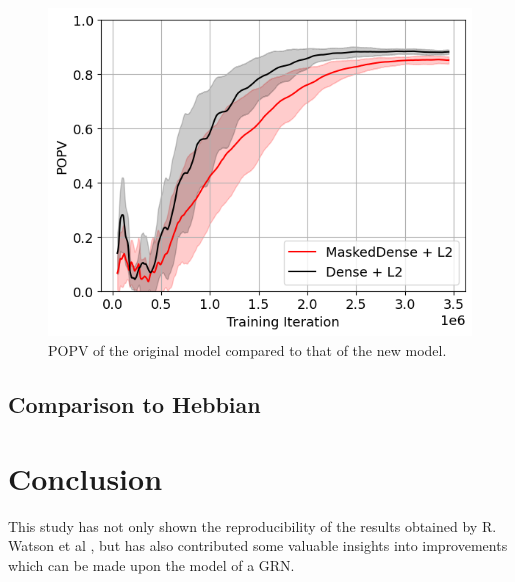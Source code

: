 \documentclass[twocolumn,a4paper,11pt]{article}
\begin{document}
    \begin{figure}[h]
        \centering
        \includegraphics[width=0.9\linewidth]{ex-img/final-l2-popv.png}
        \caption{POPV of the original model compared to that of the new model.} \label{fig:ex-B2}
    \end{figure}

    \subsection{Comparison to Hebbian}
    
    \section{Conclusion}
    This study has not only shown the reproducibility of the results obtained by R. Watson et al \cite{original-paper}, but has also contributed some valuable insights into improvements which can be made upon the model of a GRN.
\end{document}
